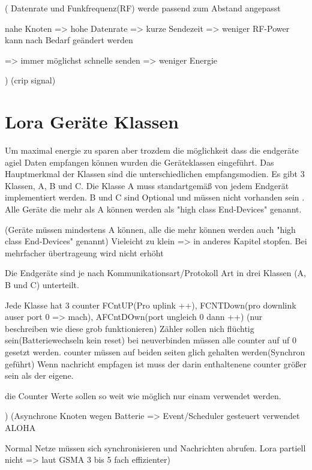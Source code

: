 \documentclass[a4paper,12pt]{article}
\begin{document}
                \cite{LoraLimit}(
                    Datenrate und Funkfrequenz(RF) werde passend zum Abstand angepasst

                    nahe Knoten => hohe Datenrate => kurze Sendezeit => weniger RF-Power
                    kann nach Bedarf geändert werden

                    => immer möglichst schnelle senden => weniger Energie

                )
                \cite{LoraClasses}(crip signal)
    \section{Lora Geräte Klassen} \label{sec:klassen}
        Um maximal energie zu sparen aber trozdem die möglichkeit dass die endgeräte agiel Daten empfangen können wurden die Geräteklassen eingeführt. Das Hauptmerkmal der Klassen sind die unterschiedlichen empfangsmodien.
        Es gibt 3 Klassen, A, B und C. Die Klasse A muss standartgemäß von jedem Endgerät implementiert werden. B und C sind Optional und müssen nicht vorhanden sein . Alle 
        Geräte die mehr als A können werden als "high class End-Devices" genannt. 

        \cite{LoRaSpec}(Geräte müssen mindestens A können, alle die mehr können werden auch "high class End-Devices" genannt)
        Vieleicht zu klein => in anderes Kapitel stopfen. Bei mehrfacher übertrageung wird nicht erhöht

        Die Endgeräte sind je nach Kommunikationsart/Protokoll Art in drei Klassen (A, B und C) unterteilt. 
        
        Jede Klasse hat 3 counter FCntUP(Pro uplink ++), FCNTDown(pro downlink auser port 0 => mach), AFCntDOwn(port ungleich 0 dann ++)   (nur beschreiben wie diese grob funktionieren) Zähler sollen nich flüchtig sein(Batteriewechseln kein reset)
        bei neuverbinden müssen alle counter auf uf 0 gesetzt werden. counter müssen auf beiden seiten glich gehalten werden(Synchron geführt)
        Wenn nachricht empfagen ist muss der darin enthaltenene counter größer sein als der eigene. 

        die Counter Werte sollen so weit wie möglich nur einam verwendet werden.
        
        )
        \cite{WhatIsLoRa}(Asynchrone Knoten wegen Batterie => Event/Scheduler gesteuert verwendet ALOHA
        
        Normal Netze müssen sich synchronisieren und Nachrichten abrufen. Lora partiell nicht => laut GSMA 3 bis 5 fach effizienter)
    
\end{document}
